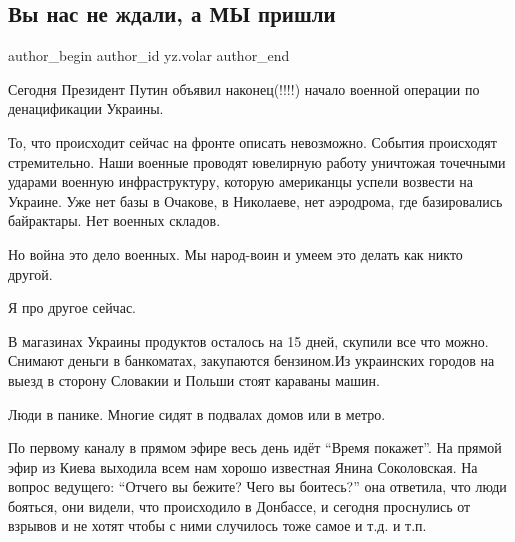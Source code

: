  
 
 
 
 
 
\subsection{Вы нас не ждали, а МЫ пришли}
\label{sec:24_02_2022.yz.volar.1.vy_nas_ne_zhdali_a_my_prishli}
 
\ifcmt
 author_begin
   author_id yz.volar
 author_end
\fi

Сегодня Президент Путин объявил наконец(!!!!) начало военной операции по
денацификации Украины.


То, что происходит сейчас на фронте описать невозможно. События происходят
стремительно. Наши военные проводят ювелирную работу уничтожая точечными
ударами военную инфраструктуру, которую американцы успели возвести на Украине.
Уже нет базы в Очакове, в Николаеве, нет аэродрома, где базировались
байрактары. Нет военных складов.

Но война это дело военных. Мы народ-воин и умеем это делать как никто другой.

Я про другое сейчас.

В магазинах Украины продуктов осталось на 15 дней, скупили все что можно.
Снимают деньги в банкоматах, закупаются бензином.Из украинских городов на выезд
в сторону Словакии и Польши стоят караваны машин.

Люди в панике. Многие сидят в подвалах домов или в метро.

По первому каналу в прямом эфире весь день идёт \enquote{Время покажет}. На прямой эфир
из Киева выходила всем нам хорошо известная Янина Соколовская. На вопрос
ведущего: \enquote{Отчего вы бежите? Чего вы боитесь?} она ответила, что люди бояться,
они видели, что происходило в Донбассе, и сегодня проснулись от взрывов и не
хотят чтобы с ними случилось тоже самое и т.д. и т.п.

